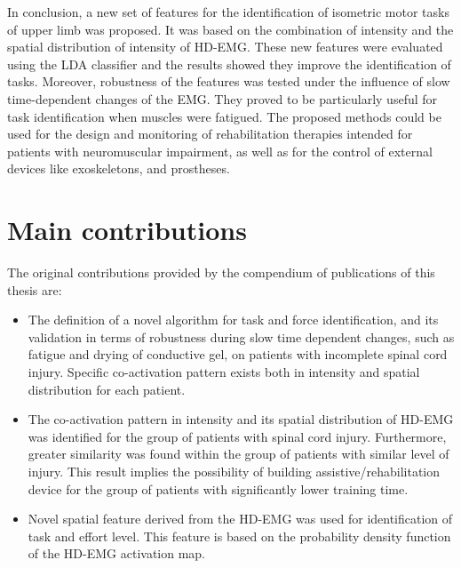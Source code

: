 In conclusion, a new set of features for the identification of isometric motor tasks of upper limb was proposed. It was based on the combination of intensity and the spatial distribution of intensity of HD-EMG. These new features were evaluated using the LDA classifier and the results showed they improve the identification of tasks. Moreover, robustness of the features was tested under the influence of slow time-dependent changes of the EMG. They proved to be particularly useful for task identification when muscles were fatigued. The proposed methods could be used for the design and monitoring of rehabilitation therapies intended for patients with neuromuscular impairment, as well as for the control of external devices like exoskeletons, and prostheses.


\section{Main contributions}

The original contributions provided by the compendium of publications of this thesis are:

\begin{itemize}
\item The definition of a novel algorithm for task and force identification, and its validation in terms of robustness during slow time dependent changes, such as fatigue and drying of conductive gel, on patients with incomplete spinal cord injury. Specific co-activation pattern exists both in intensity and spatial distribution for each patient.  

\item The co-activation pattern in intensity and its spatial distribution of HD-EMG was identified for the group of patients with spinal cord injury. Furthermore, greater similarity was found within the group of patients with similar level of injury. This result implies the possibility of building assistive/rehabilitation device for the group of patients with significantly lower training time. 

\item Novel spatial feature derived from the HD-EMG was used for identification of task and effort level. This feature is based on the probability density function of the HD-EMG activation map. 


\end{itemize}

